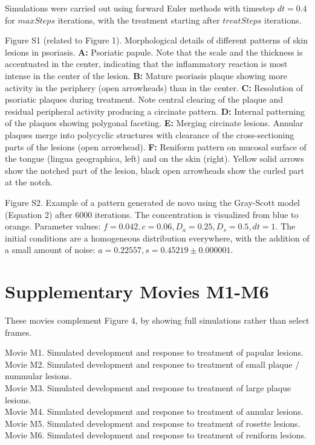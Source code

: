 Simulations were carried out using forward Euler methods with timestep $dt = 0.4$ for $maxSteps$ iterations, with the treatment starting after $treatSteps$ iterations.

Figure S1 (related to Figure 1). Morphological details of different patterns of skin lesions in psoriasis. \textbf{A:} Psoriatic papule. Note that the scale and the thickness is accentuated in the center, indicating that the inflammatory reaction is most intense in the center of the lesion. \textbf{B:} Mature psoriasis plaque showing more activity in the periphery (open arrowheads) than in the center. \textbf{C:} Resolution of psoriatic plaques during treatment. Note central clearing of the plaque and residual peripheral activity producing a circinate pattern. \textbf{D:} Internal patterning of the plaques showing polygonal faceting. \textbf{E:} Merging circinate lesions. Annular plaques merge into polycyclic structures with clearance of the cross-sectioning parts of the lesions (open arrowhead). \textbf{F:} Reniform pattern on mucosal surface of the tongue (lingua geographica, left) and on the skin (right). Yellow solid arrows show the notched part of the lesion, black open arrowheads show the curled part at the notch.

Figure S2. Example of a pattern generated de novo using the Gray-Scott model (Equation 2) after 6000 iterations. The concentration is visualized from blue to orange. Parameter values: $f=0.042, c=0.06,  D_a=0.25, D_s=0.5, dt=1$. The initial conditions are a homogeneous distribution everywhere, with the addition of a small amount of noise: $a=0.22557, s=0.45219±0.000001$.

\section{Supplementary Movies M1-M6}
These movies complement Figure 4, by showing full simulations rather than select frames.

Movie M1. Simulated development and response to treatment of papular lesions. \\
Movie M2. Simulated development and response to treatment of small plaque / nummular lesions. \\
Movie M3. Simulated development and response to treatment of large plaque lesions. \\
Movie M4. Simulated development and response to treatment of annular lesions. \\
Movie M5. Simulated development and response to treatment of rosette lesions. \\
Movie M6. Simulated development and response to treatment of reniform lesions.